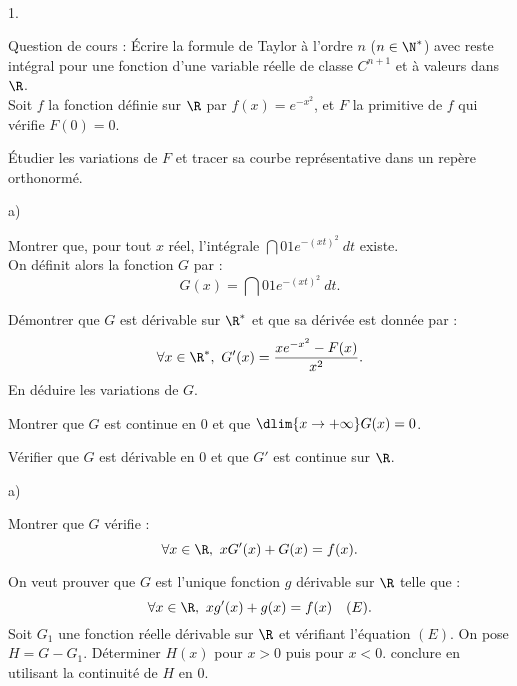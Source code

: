 \documentclass[11pt]{article}%
\begin{document}

\begin{exerciceAP}~ 
  \begin{noliste}{1.}
    \setlength{\itemsep}{2mm}
  \item Question de cours : Écrire la formule de Taylor à l'ordre $n$
    ($n \in \N^*$) avec reste intégral pour une fonction d'une
    variable réelle de classe $C^{n+1}$ et à valeurs dans $\R$.
    \\[.2cm]
    Soit $f$ la fonction définie sur $\R$ par $f(x) = e^{-x^2}$, et
    $F$ la primitive de $f$ qui vérifie $F(0) = 0$.
  \item Étudier les variations de $F$ et tracer sa courbe
    représentative dans un repère orthonormé.
  \item \begin{noliste}{a)}
    \setlength{\itemsep}{2mm}
    \item Montrer que, pour tout $x$ réel, l'intégrale $\dint{0}{1}
      e^{- (xt)^2}\ dt$ existe. \\
      On définit alors la fonction $G$ par :
      \[
      G(x) = \dint{0}{1} e^{-(xt)^2}\ dt. 
      \]
    \item Démontrer que $G$ est dérivable sur $\R^*$ et que sa dérivée
      est donnée par :
      \[
      \forall x \in \R^*,\ G'(x) = \frac{x e^{-x^2} - F(x) }{x^2}.
      \]
      En déduire les variations de $G$.
    \item Montrer que $G$ est continue en 0 et que $\dlim{x
        \rightarrow +\infty} G(x) = 0$.
    \item Vérifier que $G$ est dérivable en 0 et que $G'$ est continue
      sur $\R$.
    \end{noliste}
  \item
    \begin{noliste}{a)}
    \setlength{\itemsep}{2mm} 
    \item Montrer que $G$ vérifie : 
      \[
      \forall x \in \R,\ x G'(x) + G(x) = f(x).
      \]
    \item On veut prouver que $G$ est l'unique fonction $g$ dérivable
      sur $\R$ telle que :
      \[
      \forall x \in \R,\ x g'(x) + g(x) = f(x) \ \ \ (E).
      \]
      Soit $G_1$ une fonction réelle dérivable sur $\R$ et vérifiant
      l'équation $(E)$. On pose $H = G - G_1$. Déterminer $H(x)$ pour
      $x > 0$ puis pour $x < 0$. conclure en utilisant la continuité
      de $H$ en 0.
    \end{noliste} 
  \end{noliste}
\end{exerciceAP}
\end{document}
